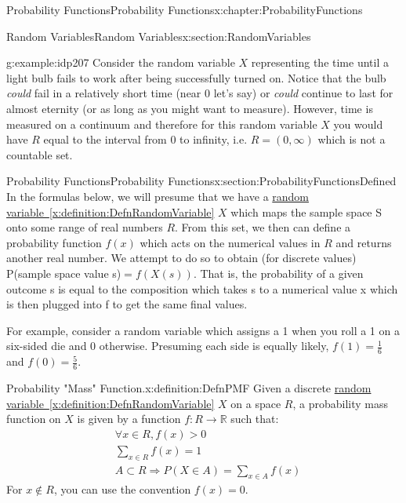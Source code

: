\documentclass[oneside,10pt,]{book}
\newcommand{\xreffont}{\relax}
\numberwithin{equation}{section}
\newcommand{\gt}{>}
\begin{document}
\begin{chapterptx}{Probability Functions}{}{Probability Functions}{}{}{x:chapter:ProbabilityFunctions}
\begin{sectionptx}{Random Variables}{}{Random Variables}{}{}{x:section:RandomVariables}
\begin{example}{}{g:example:idp207}
Consider the random variable \(X\) representing the time until a light bulb fails to work after being successfully turned on.  Notice that the bulb \emph{could} fail in a relatively short time (near 0 let's say) or \emph{could} continue to last for almost eternity (or as long as you might want to measure).  However, time is measured on a continuum and therefore for this random variable \(X\) you would have \(R\) equal to the interval from 0 to infinity, i.e. \(R = (0,\infty)\) which is not a countable set.%
\end{example}
%
\end{sectionptx}
%
%
\typeout{************************************************}
\typeout{************************************************}
%
\begin{sectionptx}{Probability Functions}{}{Probability Functions}{}{}{x:section:ProbabilityFunctionsDefined}
In the formulas below, we will presume that we have a \hyperref[x:definition:DefnRandomVariable]{random variable~{\xreffont\ref{x:definition:DefnRandomVariable}}} \(X\) which maps the sample space S onto some range of real numbers \(R\).  From this set, we then can define a probability function \(f(x)\) which acts on the numerical values in \(R\) and returns another real number.  We attempt to do so to obtain (for discrete values) P(sample space value s)\(= f(X(s))\).  That is, the probability of a given outcome s is equal to the composition which takes s to a numerical value x which is then plugged into f to get the same final values.%
\par
For example, consider a random variable which assigns a 1 when you roll a 1 on a six-sided die and 0 otherwise. Presuming each side is equally likely, \(f(1) = \frac{1}{6}\) and \(f(0) = \frac{5}{6}\).%
\par
\begin{definition}{Probability "Mass" Function.}{x:definition:DefnPMF}%
Given a discrete \hyperref[x:definition:DefnRandomVariable]{random variable~{\xreffont\ref{x:definition:DefnRandomVariable}}} \(X\) on a space \(R\), a probability mass function on \(X\) is given by a function \(f:R \rightarrow \mathbb{R}\) such that:%
\begin{align*}
& \forall x \in R , f(x) \gt 0\\
& \sum_{x \in R} f(x) = 1\\
& A \subset R \Rightarrow P(X \in A) = \sum_{x \in A}f(x)
\end{align*}
For \(x \not\in R\), you can use the convention \(f(x)=0\).%

\end{definition}
\end{sectionptx}
\end{chapterptx}
\end{document}
